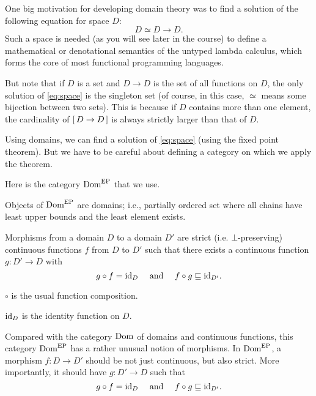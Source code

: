 \begin{enumcirc}
	\item
	One big motivation for developing domain theory was to find a solution of the
	following equation for space $D$:
	\begin{equation} \label{eq:space}
		D \simeq D \to D.
	\end{equation}
	Such a space is needed (as you will see later in the course) to define a
	mathematical or denotational semantics of the untyped lambda calculus, which
	forms the core of most functional programming languages.
	\item
	But note that if $D$ is a set and $D \to D$ is the set of all functions on $D$,
	the only solution of \cref{eq:space} is the singleton set (of course, in this
	case, $\simeq$ means some bijection between two sets).
	This is because if $D$ contains more than one element, the cardinality of
	$\brackets{D \to D}$ is always strictly larger than that of $D$.
	\item
	Using domains, we can find a solution of \cref{eq:space} (using the fixed point
	theorem).
	But we have to be careful about defining a category on which we apply the
	theorem.
	\item
	Here is the category $\Dom[EP]$ that we use.
	\begin{enumrm}
		\item
		Objects of $\Dom[EP]$ are domains; i.e., partially ordered set where all chains
		have least upper bounds and the least element exists.
		\item
		Morphisms from a domain $D$ to a domain $D'$ are strict (i.e.
		$\bot$-preserving) continuous functions $f$ from $D$ to $D'$ such that there
		exists a continuous function $g: D' \to D$ with
		\[
			g \circ f = \id_D \quad \textrm{ and } \quad f \circ g \sqsubseteq \id_{D'}.
		\]
		\item
		$\circ$ is the usual function composition.
		\item
		$\id_D$ is the identity function on $D$.
	\end{enumrm}
	\item
	Compared with the category $\Dom$ of domains and continuous functions, this
	category $\Dom[EP]$ has a rather unusual notion of morphisms.
	In $\Dom[EP]$, a morphism $f: D \to D'$ should be not just continuous, but also
	strict.
	More importantly, it should have $g: D' \to D$ such that
	\[
		g \circ f = \id_D \quad \textrm{ and } \quad f \circ g \sqsubseteq \id_{D'}.
\]
\end{enumcirc}
